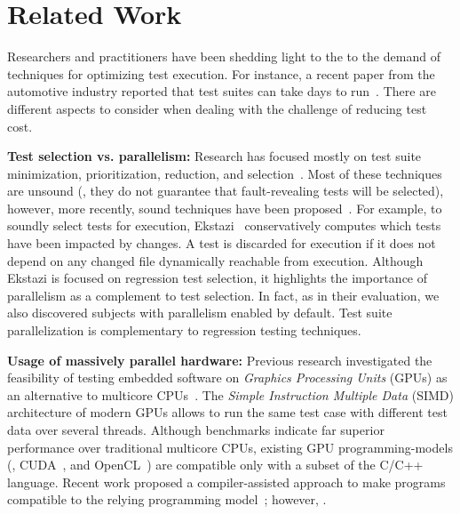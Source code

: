 \section{Related Work}
\label{sec:related}
Researchers and practitioners have been shedding light to the to the
demand of techniques for optimizing test execution. For instance, a
recent paper from the automotive industry reported that test suites
can take days to run~\cite{artl-etal-icst2015}.  There are different
aspects to consider when dealing with the challenge of reducing
test cost. 

\textbf{Test selection vs. parallelism:}
Research has focused mostly on test suite minimization,
prioritization, reduction, and selection~\cite{yoo-harman-stvr2012}.
Most of these techniques are unsound (\ie{}, they do not guarantee
that fault-revealing tests will be selected), however, more recently,
sound techniques have been
proposed~\cite{gligoric-etal-issta2015,soetens-etal-2016}.  For
example, to soundly select tests for execution,
Ekstazi~\cite{ekstazi-web,gligoric-etal-issta2015} conservatively
computes which tests have been impacted by changes.  A test is
discarded for execution if it does not depend on any changed file
dynamically reachable from execution. Although Ekstazi is focused on
regression test selection, it highlights the importance of parallelism
as a complement to test selection.  In fact, as in their evaluation, we
also discovered subjects with parallelism enabled by default.  Test
suite parallelization is complementary to regression testing
techniques.

\textbf{Usage of massively parallel hardware:}
Previous research investigated the feasibility of testing embedded
software on \emph{Graphics Processing Units} (GPUs) as an alternative
to multicore CPUs~\cite{rajan-etal-ase2014}.
The \emph{Simple Instruction Multiple Data} (SIMD) architecture of
modern GPUs allows to run the same test case with different test data
over several threads.
Although benchmarks indicate far superior performance over traditional
multicore CPUs, existing GPU programming-models (\eg,
CUDA~\cite{cuda}, and OpenCL~\cite{opencl}) are compatible only with a
subset of the C/C++ language.
Recent work proposed a compiler-assisted approach to make programs
compatible to the relying programming
model~\cite{yaneva-etal-issta2017}; however, .


